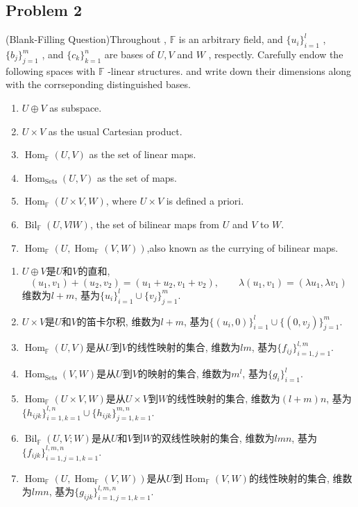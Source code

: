 \documentclass[11pt]{ctexart}
\theoremstyle{definition}
\numberwithin{equation}{section}
\newcommand{\op}[1]{\operatorname{#1}}%
\newcommand{\FF}{\mathbb{F}}%
\theoremstyle{definition}
\theoremstyle{remark}
\begin{document}
\subsection{Problem 2}
(Blank-Filling Question)Throughout , $\FF$ is an arbitrary field, and $\{u_i\}_{i=1}^l$ , $\{b_j\}_{j=1}^m$ , and $\{c_k\}_{k=1}^n$ are bases of $U , V$ and $W$ , respectly.
Carefully endow the following spaces with $\FF$ -linear structures. and write down their dimensions along with the corrseponding distinguished bases.
\begin{enumerate}
    \item $U \oplus V$ as subspace.
    \item $U \times V$ as the usual Cartesian product.
    \item $\op{Hom}_{\FF}(U,V)$ as the set of linear maps.
    \item $\op{Hom}_{\op{Sets}}(U,V)$ as the set of maps.
    \item $\op{Hom}_{\FF}(U\times V, W)$, where $U \times V$ is defined a priori.
    \item $\op{Bil}_{\FF}(U,VlW)$, the set of bilinear maps from $U $ and $V$ to $W$.
    \item $\op{Hom}_{\FF}(U,\op{Hom}_{\FF}(V,W))$,also known as the  currying of bilinear maps.
\end{enumerate} 
\begin{aaa}
    \begin{enumerate}
        \item $U\oplus V$是$U$和$V$的直和,\[(u_1,v_1)+(u_2,v_2)=(u_1+u_2,v_1+v_2),\qquad \lambda(u_1,v_1)=(\lambda u_1,\lambda v_1)\]维数为$l+m$, 基为$\{u_i\}_{i=1}^l\cup\{v_j\}_{j=1}^m$.
        \item $U\times V$是$U$和$V$的笛卡尔积, 维数为$l+m$, 基为$\{(u_i,0)\}_{i=1}^l\cup\{(0,v_j)\}_{j=1}^m$.
        \item $\op{Hom}_{\FF}(U,V)$是从$U$到$V$的线性映射的集合, 维数为$lm$, 基为$\{f_{ij}\}_{i=1,j=1}^{l,m}$.
        \item $\op{Hom}_{\op{Sets}}(V,W)$是从$U$到$V$的映射的集合, 维数为$m^l$, 基为$\{g_{i}\}_{i=1}^{l}$.
        \item $\op{Hom}_{\FF}(U\times V, W)$是从$U\times V$到$W$的线性映射的集合, 维数为$(l+m)n$, 基为$\{h_{ijk}\}_{i=1,k=1}^{l,n} \cup \{h_{ijk}\}_{j=1,k=1}^{m,n}$.
        \item $\op{Bil}_{\FF }(U,V;W)$是从$U$和$V$到$W$的双线性映射的集合, 维数为$lmn$, 基为$\{f_{ijk}\}_{i=1,j=1,k=1}^{l,m,n}$.
        \item $\op{Hom}_{\FF}(U,\op{Hom}_{\FF}(V,W))$是从$U$到$\op{Hom}_{\FF}(V,W)$的线性映射的集合, 维数为$lmn$, 基为$\{g_{ijk}\}_{i=1,j=1,k=1}^{l,m,n}$.
    \end{enumerate}
\end{aaa}
\end{document}
